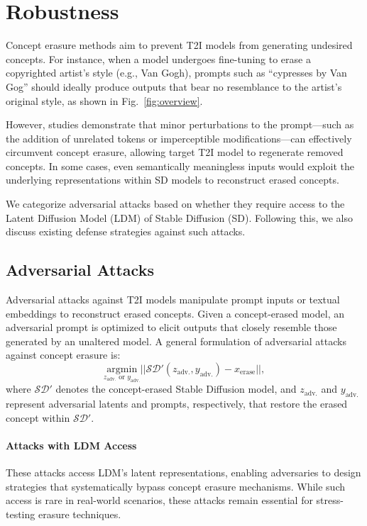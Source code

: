 \section{Robustness} \label{sec:robustness}
Concept erasure methods aim to prevent T2I models from generating undesired concepts. For instance, when a model undergoes fine-tuning to erase a copyrighted artist’s style (e.g., Van Gogh), prompts such as ``cypresses by Van Gog'' should ideally produce outputs that bear no resemblance to the artist’s original style, as shown in Fig.~\ref{fig:overview}.

However, studies demonstrate that minor perturbations to the prompt—such as the addition of unrelated tokens or imperceptible modifications—can effectively circumvent concept erasure, allowing target T2I model to regenerate removed concepts. In some cases, even semantically meaningless inputs would  exploit the underlying representations within SD models to reconstruct erased concepts.

We categorize adversarial attacks based on whether they require access to the Latent Diffusion Model (LDM) of Stable Diffusion (SD). Following this, we also discuss existing defense strategies against such attacks.

\subsection{Adversarial Attacks} \label{subsec:adv_atk}
Adversarial attacks against T2I models manipulate prompt inputs or textual embeddings to reconstruct erased concepts. Given a concept-erased model, an adversarial prompt is optimized to elicit outputs that closely resemble those generated by an unaltered model. A general formulation of adversarial attacks against concept erasure is:
\begin{equation}
\underset{z_{\text{adv.}} \text{ or } y_{\text{adv.}}}{\mathrm{argmin}}  || \mathcal{SD'}(z_{\text{adv.}},y_{\text{adv.}}) - x_{\text{erase}} ||,    
\end{equation}
where \( \mathcal{SD'} \) denotes the concept-erased Stable Diffusion model, and \( z_{\text{adv.}} \) and \( y_{\text{adv.}} \) represent adversarial latents and prompts, respectively, that restore the erased concept within \( \mathcal{SD'} \).


\paragraph{Attacks with LDM Access}
These attacks access LDM’s latent representations, enabling adversaries to design strategies that systematically bypass concept erasure mechanisms. While such access is rare in real-world scenarios, these attacks remain essential for stress-testing erasure techniques.

